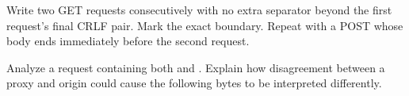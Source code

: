 \begin{exercise}
Write two GET requests consecutively with no extra separator beyond the first
request's final CRLF pair. Mark the exact boundary. Repeat with a POST whose body
ends immediately before the second request.
\end{exercise}

\begin{exercise}
Analyze a request containing both  and
. Explain how disagreement between a proxy and origin
could cause the following bytes to be interpreted differently.
\end{exercise}

